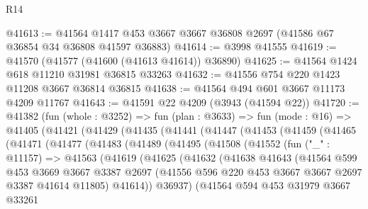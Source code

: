 \begin{lexlean}{R14}
\begin{coremodule}
@41613 := @41564 @1417 @453 @3667 @3667 @36808 @2697 (@41586 @67 @36854 @34 @36808 @41597 @36883)
@41614 := @3998 @41555
@41619 := @41570 (@41577 (@41600 (@41613 @41614)) @36890)
@41625 := @41564 @1424 @618 @11210 @31981 @36815 @33263
@41632 := @41556 @754 @220 @1423 @11208 @3667 @36814 @36815
@41638 := @41564 @494 @601 @3667 @11173 @4209 @11767
@41643 := @41591 @22 @4209 (@3943 (@41594 @22))
@41720 := @41382
    (fun (whole : @3252) =>
    fun (plan : @3633) =>
    fun (mode : @16) =>
    @41405
      (@41421
        (@41429
          (@41435
            (@41441
              (@41447
                (@41453
                  (@41459
                    (@41465
                      (@41471
                        (@41477
                          (@41483
                            (@41489
                              (@41495
                                (@41508
                                  (@41552
                                    (fun ("_" : @11157) =>
                                    @41563
                                      (@41619
                                        (@41625
                                          (@41632
                                            (@41638
                                              @41643
                                              (@41564
                                                @599
                                                @453
                                                @3669
                                                @3667
                                                @3387
                                                @2697
                                                (@41556
                                                  @596
                                                  @220
                                                  @453
                                                  @3667
                                                  @3667
                                                  @2697
                                                  @3387
                                                  @41614
                                                  @11805)
                                                @41614))
                                            @36937)
                                          (@41564
                                            @594
                                            @453
                                            @31979
                                            @3667
                                            @33261

\end{coremodule}
\end{lexlean}
